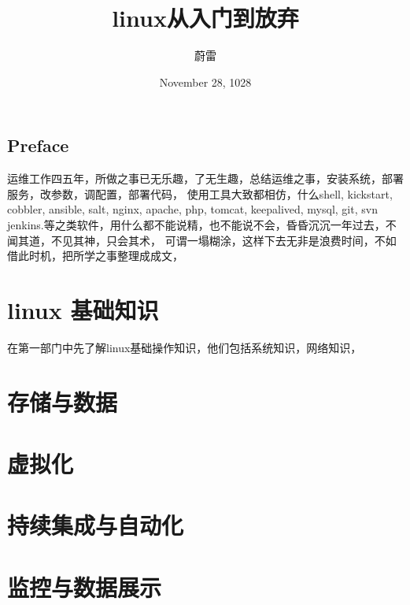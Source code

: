 \documentclass[11pt,a4paper]{book}
\title{linux从入门到放弃}
\author{蔚雷}
\date{November 28, 1028}
\begin{document}
\maketitle

\tableofcontents 

\mainmatter

\chapter*{Preface} 
运维工作四五年，所做之事已无乐趣，了无生趣，总结运维之事，安装系统，部署服务，改参数，调配置，部署代码，
使用工具大致都相仿，什么shell, kickstart, cobbler, ansible, salt, nginx, apache, php, tomcat, keepalived, mysql, git, svn 
jenkins.等之类软件，用什么都不能说精，也不能说不会，昏昏沉沉一年过去，不闻其道，不见其神，只会其术，
可谓一塌糊涂，这样下去无非是浪费时间，不如借此时机，把所学之事整理成成文，

\part{linux 基础知识}

在第一部门中先了解linux基础操作知识，他们包括系统知识，网络知识，








\part{存储与数据}

\part{虚拟化}



\part{持续集成与自动化}


\part{监控与数据展示}


\end{document}
